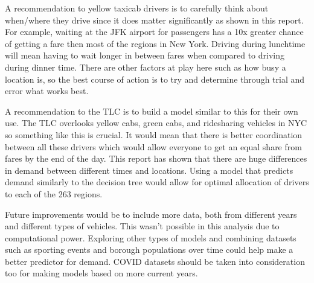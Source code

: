 \documentclass[11pt]{article}
\begin{document}
A recommendation to yellow taxicab drivers is to carefully think about when/where they drive since it does matter significantly as shown in this report. For example, waiting at the JFK airport for passengers has a 10x greater chance of getting a fare then most of the regions in New York. Driving during lunchtime will mean having to wait longer in between fares when compared to driving during dinner time. There are other factors at play here such as how busy a location is, so the best course of action is to try and determine through trial and error what works best.

A recommendation to the TLC is to build a model similar to this for their own use. The TLC overlooks yellow cabs, green cabs, and ridesharing vehicles in NYC so something like this is crucial. It would mean that there is better coordination between all these drivers which would allow everyone to get an equal share from fares by the end of the day. This report has shown that there are huge differences in demand between different times and locations. Using a model that predicts demand similarly to the decision tree would allow for optimal allocation of drivers to each of the 263 regions.

Future improvements would be to include more data, both from different years and different types of vehicles. This wasn’t possible in this analysis due to computational power. Exploring other types of models and combining datasets such as sporting events and borough populations over time could help make a better predictor for demand. COVID datasets should be taken into consideration too for making models based on more current years.


\clearpage

\printbibliography
\end{document}
